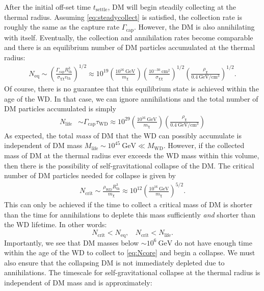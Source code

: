 \documentclass[preprintnumbers,amsmath,amssymb,prd,superscriptaddress]{revtex4}
\newcommand{\GeV}{\text{GeV}}
\newcommand{\cm}{\text{cm}}
\def\r{\right)}
\def\l{\left(}
\begin{document}
After the initial off-set time $t_\text{settle}$, DM will begin steadily collecting at the thermal radius.
Assuming \eqref{eq:steadycollect} is satisfied, the collection rate is roughly the same as the capture rate $\Gamma_\text{cap}$. 
However, the DM is also annihilating with itself.
Eventually, the collection and annihilation rates become comparable and there is an equilibrium number of DM particles accumulated at the thermal radius:
\begin{align}
N_\text{eq} \sim \l \frac{\Gamma_\text{cap} R_\text{th}^3}{\sigma_{\chi \chi} v_\text{th}} \r^{1/2} \approx 10^{19} \l \frac{10^{16} ~\GeV}{m_\chi} \r \l \frac{10^{-30} ~\cm^2}{\sigma_{\chi \chi}} \r^{1/2} \l \frac{\rho_\chi}{0.4 ~\GeV/\cm^3} \r^{1/2}.
\end{align}
Of course, there is no guarantee that this equilibrium state is achieved within the age of the WD. 
In that case, we can ignore annihilations and the total number of DM particles accumulated is simply
\begin{align}
N_\text{life} &\sim \Gamma_\text{cap} \tau_\text{WD} \approx 10^{29}  \l \frac{10^{16} ~\GeV}{m_\chi} \r \l \frac{\rho_\chi}{0.4 ~\GeV/\cm^3} \r
\end{align}
As expected, the total \emph{mass} of DM that the WD can possibly accumulate is independent of DM mass $M_\text{life} \sim 10^{45} ~\GeV \ll M_\text{WD}$. 
However, if the collected mass of DM at the thermal radius ever exceeds the WD mass within this volume, then there is the possibility of self-gravitational collapse of the DM.
The critical number of DM particles needed for collapse is given by
\begin{align}
\label{eq:Ncore}
    N_\text{crit} \sim \frac{\rho_\text{WD} R^3_\text{th}}{m_\chi} \approx 10^{12} \l \frac{10^{16} ~\GeV}{m_\chi} \r^{5/2}. \nonumber
\end{align}
This can only be achieved if the time to collect a critical mass of DM is shorter than the time for annihilations to deplete this mass sufficiently \emph{and} shorter than the WD lifetime. 
In other words:
\begin{equation}
\label{eq:collapsecondition}
N_\text{crit} < N_\text{eq}, ~~~~ N_\text{crit} < N_\text{life}.
\end{equation}
Importantly, we see that DM masses below $\sim 10^{6} ~\GeV$ do not have enough time within the age of the WD to collect to \eqref{eq:Ncore} and begin a collapse. 
We must also ensure that the collapsing DM is not immediately depleted due to annihilations.
The timescale for self-gravitational collapse at the thermal radius is independent of DM mass and is approximately:
\end{document}
